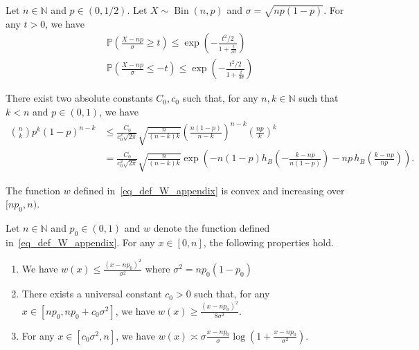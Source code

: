 \documentclass[10pt,a4paper]{amsart}
\begin{document}
\begin{lemma}\label{lem_rescalen_Bernstein}
    Let $n\in \mathbb N$ and $p \in (0,1/2)$. 
    Let $X \sim \operatorname{Bin}(n,p)$ and $\sigma = \sqrt{np(1-p)}$.
    For any $t > 0$, we have
    \begin{align*}
        \mathbb P\left(\frac{X - np}{\sigma} \geq t\right) \leq \exp\left(- \frac{t^2/2}{1+\frac{t}{3\sigma}}\right)\\
        \mathbb P\left(\frac{X - np}{\sigma} \leq -t\right) \leq \exp\left(- \frac{t^2/2}{1+\frac{t}{3\sigma}}\right)
    \end{align*}
\end{lemma}

\begin{lemma}\label{lem_Stirling}
    There exist two absolute constants $C_0, c_0$ such that, for any $n,k \in \mathbb N$ such that $k < n$ and $p \in (0,1)$, we have
    \begin{align*}
        {n \choose k} p^k (1-p)^{n-k} &\leq \frac{C_0}{c_0^2\sqrt{2\pi}} \sqrt{\frac{n}{(n-k)k}} \left(\frac{n(1-p)}{n-k}\right)^{n-k} \left(\frac{np}{k}\right)^k\\
        & = \frac{C_0}{c_0^2\sqrt{2\pi}} \sqrt{\frac{n}{(n-k)k}} \exp\left(-n(1-p) h_B\left(-\frac{k-np}{n(1-p)}\right) - np \, h_B\left(\frac{k-np}{np}\right)\right). 
    \end{align*}
\end{lemma}

\begin{lemma}\label{lem_W_cvx_increasing}
    The function $w$ defined in~\eqref{eq_def_W_appendix} is convex and increasing over $[np_0, n)$.
\end{lemma}

\begin{lemma}\label{lem_w_quadratic}
    Let $n\in \mathbb N$ and $p_0 \in (0,1)$ and $w$ denote the function defined in~\eqref{eq_def_W_appendix}. For any $x \in [0,n]$, the following properties hold.
    \begin{enumerate}
        \item We have $w(x) \leq \frac{(x-np_0)^2}{ \sigma^2}$ where $\sigma^2 = np_0(1-p_0)$
        \item There exists a universal constant $c_0>0$ such that, for any $x \in [np_0, np_0 + c_0\sigma^2]$, we have $w(x) \geq \frac{(x-np_0)^2}{8 \sigma^2}$.
        \item For any $x \in [c_0 \sigma^2, n]$, we have $w(x) \asymp \sigma \frac{x-np_0}{\sigma} \log\left(1+ \frac{x-np_0}{\sigma^2}\right).$
    \end{enumerate}
\end{lemma}
\end{document}
